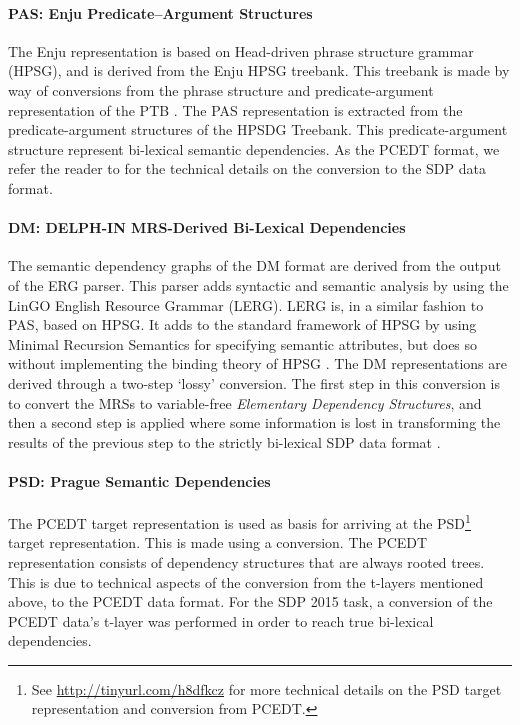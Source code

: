 \paragraph{PAS: Enju Predicate–Argument Structures} The Enju representation is based on Head-driven phrase structure grammar (HPSG), and is derived from the Enju HPSG treebank. This treebank is made by way of conversions from the phrase structure and predicate-argument representation of the PTB \cite{Oepen:14}. The PAS representation is extracted from the predicate-argument structures of the HPSDG Treebank. This predicate-argument structure represent bi-lexical semantic dependencies. As the PCEDT format, we refer the reader to  for the technical details on the conversion to the SDP data format.

\paragraph{DM: DELPH-IN MRS-Derived Bi-Lexical Dependencies} The semantic dependency graphs of the DM format are derived from the output of the ERG parser. This parser adds syntactic and semantic analysis by using the LinGO English Resource Grammar (LERG). LERG is, in a similar fashion to PAS, based on HPSG. It adds to the standard framework of HPSG by using Minimal Recursion Semantics for specifying semantic attributes, but does so without implementing the binding theory of HPSG \cite{Flickinger:00}. The DM representations are derived through a two-step `lossy' conversion. The first step in this conversion is to convert the MRSs to variable-free \textit{Elementary Dependency Structures}, and then a second step is applied where some information is lost in transforming the results of the previous step to the strictly bi-lexical SDP data format \cite{Miyao:14}.

\paragraph{PSD: Prague Semantic Dependencies} The PCEDT target representation is used as basis for arriving at the PSD\footnote{See \url{http://tinyurl.com/h8dfkcz} for more technical details on the PSD target representation and conversion from PCEDT.} target representation. This is made using a conversion. The PCEDT representation consists of dependency structures that are always rooted trees. This is due to technical aspects of the conversion from the t-layers mentioned above, to the PCEDT data format. For the SDP 2015 task, a conversion of the PCEDT data's t-layer was performed in order to reach true bi-lexical dependencies.

